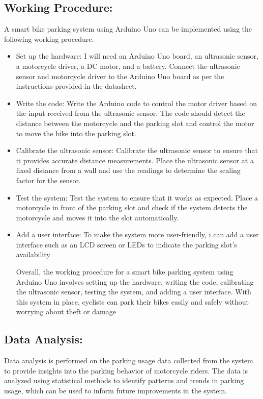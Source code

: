 \documentclass[conference]{IEEEtran}
\begin{document}
\begin{itemize}
	\subsection {Working Procedure:}
		A smart bike parking system using Arduino Uno can be implemented using the following working procedure.
	\begin{itemize}
		\item Set up the hardware: 
		I will need an Arduino Uno board, an ultrasonic sensor, a motorcycle driver, a DC motor, and a battery. Connect the ultrasonic sensor and motorcycle driver to the Arduino Uno board as per the instructions provided in the datasheet.
		\item Write the code:
		Write the Arduino code to control the motor driver based on the input received from the ultrasonic sensor. The code should detect the distance between the motorcycle and the parking slot and control the motor to move the bike into the parking slot.
		\item Calibrate the ultrasonic sensor: 
		Calibrate the ultrasonic sensor to ensure that it provides accurate distance measurements. Place the ultrasonic sensor at a fixed distance from a wall and use the readings to determine the scaling factor for the sensor.
		\item Test the system: 
		Test the system to ensure that it works as expected. Place a motorcycle in front of the parking slot and check if the system detects the motorcycle and moves it into the slot automatically.
		\item  Add a user interface: 
		To make the system more user-friendly, i can add a user interface such as an LCD screen or LEDs to indicate the parking slot's availability
			
		Overall, the working procedure for a smart bike parking system using Arduino Uno involves setting up the hardware, writing the code, calibrating the ultrasonic sensor, testing the system, and adding a user interface. With this system in place, cyclists can park their bikes easily and safely without worrying about theft or damage
	\end{itemize}	
		
	
	\subsection{Data Analysis:}
Data analysis is performed on the parking usage data collected from the system to provide insights into the parking behavior of motorcycle riders. The data is analyzed using statistical methods to identify patterns and trends in parking usage, which can be used to inform future improvements in the system.

\end{itemize}
\end{document}
